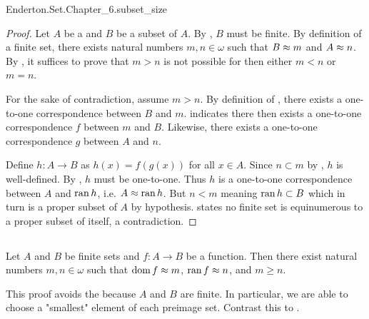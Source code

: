 \documentclass{report}
\begin{document}
    {Enderton.Set.Chapter\_6.subset\_size}

  \begin{proof}

    Let $A$ be a  and $B$ be a subset of $A$.
    By , $B$ must be finite.
    By definition of a finite set, there exists natural numbers
      $m, n \in \omega$ such that $B \approx m$ and $A \approx n$.
    By , it suffices to prove that
      $m > n$ is not possible for then either $m < n$ or $m = n$.

    For the sake of contradiction, assume $m > n$.
    By definition of , there exists a one-to-one
      correspondence between $B$ and $m$.
     indicates there then exists a one-to-one
      correspondence $f$ between $m$ and $B$.
    Likewise, there exists a one-to-one correspondence $g$ between $A$ and
      $n$.

    Define $h \colon A \rightarrow B$ as $h(x) = f(g(x))$ for all $x \in A$.
    Since $n \subset m$ by , $h$ is well-defined.
    By , $h$ must be one-to-one.
    Thus $h$ is a one-to-one correspondence between $A$ and $\mathop{\text{ran}}{h}$, i.e.
      $A \approx \mathop{\text{ran}}{h}$.
    But $n < m$ meaning $\mathop{\text{ran}}{h} \subset B$ which in turn is a proper subset
      of $A$ by hypothesis.
     states no finite set is equinumerous to a
      proper subset of itself, a contradiction.

  \end{proof}

\subsection{}%

  \begin{lemma}
    Let $A$ and $B$ be finite sets and $f \colon A \rightarrow B$ be a function.
    Then there exist natural numbers $m, n \in \omega$ such that
      $\mathop{\text{dom}}{f} \approx m$, $\mathop{\text{ran}}{f} \approx n$, and $m \geq n$.
  \end{lemma}

  \begin{note}
    This proof avoids the  because $A$ and $B$
      are finite.
    In particular, we are able to choose a "smallest" element of each preimage
      set.
    Contrast this to .
  \end{note}
\end{document}
